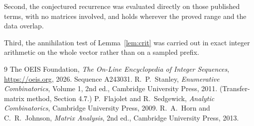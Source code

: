 \documentclass[11pt,a4paper]{article}
\theoremstyle{plain}
\theoremstyle{definition}
\begin{document}
Second, the conjectured recurrence was evaluated directly on those published terms, with no
matrices involved, and holds wherever the proved range and the data overlap.

Third, the annihilation test of Lemma~\ref{lem:crit} was carried out in exact integer
arithmetic on the whole vector rather than on a sampled prefix.

\begin{thebibliography}{9}
 The OEIS Foundation, \emph{The On-Line Encyclopedia of Integer
Sequences}, \url{https://oeis.org}, 2026. Sequence A243031.
 R.~P.~Stanley, \emph{Enumerative Combinatorics}, Volume 1, 2nd ed.,
Cambridge University Press, 2011. (Transfer-matrix method, Section 4.7.)
 P.~Flajolet and R.~Sedgewick, \emph{Analytic Combinatorics}, Cambridge
University Press, 2009.
 R.~A.~Horn and C.~R.~Johnson, \emph{Matrix Analysis}, 2nd ed., Cambridge
University Press, 2013.
\end{thebibliography}
\end{document}
